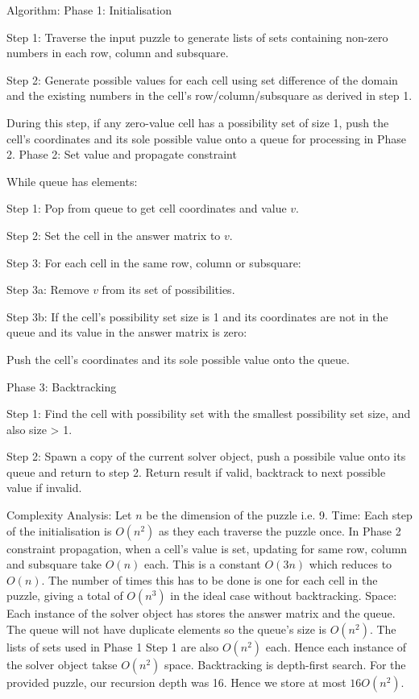 \documentclass[11pt, a4paper]{article}
\begin{document}
Algorithm:
Phase 1: Initialisation
\begin{compactitem}
  \item[Step 1:] Traverse the input puzzle to generate lists of sets containing non-zero numbers in each row, column and subsquare.
  \item[Step 2:] Generate possible values for each cell using set difference of the domain and the existing numbers in the cell's row/column/subsquare as derived in step 1.
  \item[] During this step, if any zero-value cell has a possibility set of size 1, push the cell's coordinates and its sole possible value onto a queue for processing in Phase 2.
  Phase 2: Set value and propagate constraint
  \begin{compactitem}
    \item[] While queue has elements:
    \item[Step 1:] Pop from queue to get cell coordinates and value $v$.
    \item[Step 2:] Set the cell in the answer matrix to $v$.
    \item[Step 3:] For each cell in the same row, column or subsquare:
    \item[Step 3a:] Remove $v$ from its set of possibilities.
    \item[Step 3b:] If the cell's possibility set size is 1 and its coordinates are not in the queue and its value in the answer matrix is zero:
    \item[] Push the cell's coordinates and its sole possible value onto the queue.
  \end{compactitem}

  Phase 3: Backtracking
  \begin{compactitem}
    \item[Step 1:] Find the cell with possibility set with the smallest possibility set size, and also size > 1.
    \item[Step 2:] Spawn a copy of the current solver object, push a possibile value onto its queue and return to step 2. Return result if valid, backtrack to next possible value if invalid.
  \end{compactitem}

  Complexity Analysis:
  Let $n$ be the dimension of the puzzle i.e. 9.
  Time: Each step of the initialisation is $O(n^2)$ as they each traverse the puzzle once. In Phase 2 constraint propagation, when a cell's value is set, updating for same row, column and subsquare take $O(n)$ each. This is a constant $O(3n)$ which reduces to $O(n)$. The number of times this has to be done is one for each cell in the puzzle, giving a total of $O(n^3)$ in the ideal case without backtracking.
  Space: Each instance of the solver object has stores the answer matrix and the queue. The queue will not have duplicate elements so the queue's size is $O(n^2)$. The lists of sets used in Phase 1 Step 1 are also $O(n^2)$ each. Hence each instance of the solver object takse $O(n^2)$ space.
  Backtracking is depth-first search. For the provided puzzle, our recursion depth was 16. Hence we store at most $16O(n^2)$.
\end{compactitem}
\end{document}
